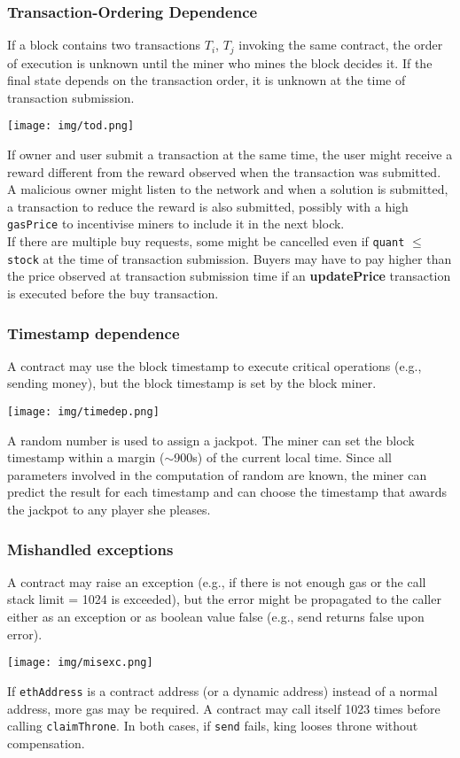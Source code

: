 \documentclass[a4paper, 10pt, titlepage]{article}
\begin{document}
\subsubsection{Transaction-Ordering Dependence}
If a block contains two transactions $T_i$, $T_j$ invoking the same contract, the order of execution is unknown until the miner who mines the block decides it. If the final state depends on the transaction order, it is unknown at the time of transaction submission. 
\begin{center}
\texttt{[image: img/tod.png]}
\end{center}
If owner and user submit a transaction at the same time, the user might receive a reward different from the reward observed when the transaction was submitted. A malicious owner might listen to the network and when a solution is submitted, a transaction to reduce the reward is also submitted, possibly with a high \lstinline|gasPrice| to incentivise miners to include it in the next block. \medskip\\
If there are multiple buy requests, some might be cancelled even if \lstinline|quant| $\leq$ \lstinline|stock| at the time of transaction submission. Buyers may have to pay higher than the price observed at transaction submission time if an \textbf{updatePrice} transaction is executed before the buy transaction.

\subsubsection{Timestamp dependence}
A contract may use the block timestamp to execute critical operations (e.g., sending money), but the block timestamp is set by the block miner. 
\begin{center}
\texttt{[image: img/timedep.png]}
\end{center}
A random number is used to assign a jackpot. The miner can set the block timestamp within a margin ($\sim$900s) of the current local time. Since all parameters involved in the computation of random are known, the miner can predict the result for each timestamp and can choose the timestamp that awards the jackpot to any player she pleases.

\subsubsection{Mishandled exceptions}
A contract may raise an exception (e.g., if there is not enough gas or the call stack limit = 1024 is exceeded), but the error might be propagated to the caller either as an exception or as boolean value false (e.g., send returns false upon error).
\begin{center}
\texttt{[image: img/misexc.png]}
\end{center}
If \lstinline|ethAddress| is a contract address (or a dynamic address) instead of a normal address, more gas may be required. A contract may call itself 1023 times before calling \lstinline|claimThrone|. In both cases, if \lstinline|send| fails, king looses throne without compensation.
\end{document}

